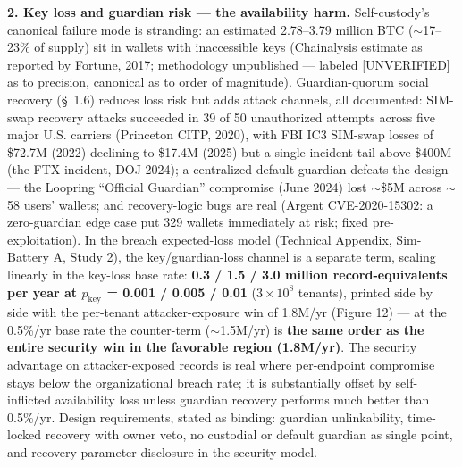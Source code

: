 \documentclass[
]{article}
\begin{document}
\textbf{2. Key loss and guardian risk --- the availability harm.}
Self-custody's canonical failure mode is stranding: an estimated
2.78--3.79 million BTC (\(\sim\)17--23\% of supply) sit in wallets with
inaccessible keys (Chainalysis estimate as reported by Fortune, 2017;
methodology unpublished --- labeled {[}UNVERIFIED{]} as to precision,
canonical as to order of magnitude). Guardian-quorum social recovery
(§~1.6) reduces loss risk but adds attack channels, all documented:
SIM-swap recovery attacks succeeded in 39 of 50 unauthorized attempts
across five major U.S. carriers (Princeton CITP, 2020), with FBI IC3
SIM-swap losses of \$72.7M (2022) declining to \$17.4M (2025) but a
single-incident tail above \$400M (the FTX incident, DOJ 2024); a
centralized default guardian defeats the design --- the Loopring
``Official Guardian'' compromise (June 2024) lost \(\sim\)\$5M across
\(\sim\)58 users' wallets; and recovery-logic bugs are real (Argent
CVE-2020-15302: a zero-guardian edge case put 329 wallets immediately at
risk; fixed pre-exploitation). In the breach expected-loss model
(Technical Appendix, Sim-Battery A, Study 2), the key/guardian-loss
channel is a separate term, scaling linearly in the key-loss base rate:
\textbf{0.3 / 1.5 / 3.0 million record-equivalents per year at
\(p_{\mathrm{key}}\) = 0.001 / 0.005 / 0.01} (\(3\times 10^{8}\)
tenants), printed side by side with the per-tenant attacker-exposure win
of 1.8M/yr (Figure 12) --- at the 0.5\%/yr base rate the counter-term
(\(\sim\)1.5M/yr) is \textbf{the same order as the entire security win
in the favorable region (1.8M/yr)}. The security advantage on
attacker-exposed records is real where per-endpoint compromise stays
below the organizational breach rate; it is substantially offset by
self-inflicted availability loss unless guardian recovery performs much
better than 0.5\%/yr. Design requirements, stated as binding: guardian
unlinkability, time-locked recovery with owner veto, no custodial or
default guardian as single point, and recovery-parameter disclosure in
the security model.
\end{document}
